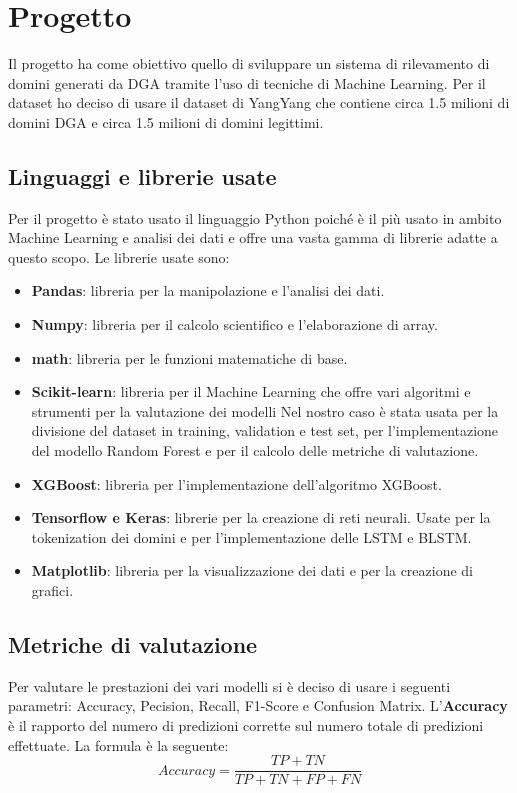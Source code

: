 \documentclass[12pt,a4paper,openright,twoside]{book}
\begin{document}
\chapter{Progetto}
Il progetto ha come obiettivo quello di sviluppare un sistema
di rilevamento di domini generati da DGA tramite
l'uso di tecniche di Machine Learning. 
Per il dataset ho deciso di usare il dataset di YangYang \cite{dataset_yangyang}
che contiene circa 1.5 milioni di domini DGA e circa 1.5 milioni di domini legittimi.

\section{Linguaggi e librerie usate}
Per il progetto è stato usato il linguaggio Python poiché è il più usato
in ambito Machine Learning e analisi dei dati e offre una vasta gamma di librerie
adatte a questo scopo. Le librerie usate sono:
\begin{itemize}
    \item \textbf{Pandas}: libreria per la manipolazione e l'analisi dei dati.
    \item \textbf{Numpy}: libreria per il calcolo scientifico e l'elaborazione di array.
    \item \textbf{math}: libreria per le funzioni matematiche di base.
    \item \textbf{Scikit-learn}: libreria per il Machine Learning che offre vari algoritmi
    e strumenti per la valutazione dei modelli Nel nostro caso è stata usata per 
    la divisione del dataset in training, validation e test set,
    per l'implementazione del modello Random Forest e per il calcolo delle metriche di valutazione.
    \item \textbf{XGBoost}: libreria per l'implementazione dell'algoritmo XGBoost.
    \item \textbf{Tensorflow e Keras}: librerie per la creazione di reti neurali. Usate per la
    tokenization dei domini e per l'implementazione delle LSTM e BLSTM.
    \item \textbf{Matplotlib}: libreria per la visualizzazione dei dati e per la creazione di grafici.
\end{itemize}

\section{Metriche di valutazione}
Per valutare le prestazioni dei vari modelli si è deciso di usare i seguenti
parametri:
Accuracy, Pecision, Recall, F1-Score e Confusion Matrix. \hfill \break
L'\textbf{Accuracy} è il rapporto del numero di predizioni
corrette sul numero totale di predizioni effettuate.
La formula è la seguente:
\begin{equation}
    Accuracy = \frac{TP + TN}{TP + TN + FP + FN}
\end{equation}
\end{document}
